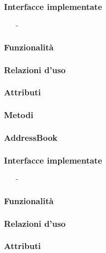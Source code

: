 \subsubsection*{Interfacce implementate}
\begin{itemize}[noitemsep,nolistsep]
  \item[-]
\end{itemize}

\subsubsection*{Funzionalità}

\subsubsection*{Relazioni d'uso}

\subsubsection*{Attributi}

\subsubsection*{Metodi}

\subsubsection{AddressBook}\label{sec:addressbook}

\subsubsection*{Interfacce implementate}
\begin{itemize}[noitemsep,nolistsep]
  \item[-]
\end{itemize}

\subsubsection*{Funzionalità}

\subsubsection*{Relazioni d'uso}

\subsubsection*{Attributi}

